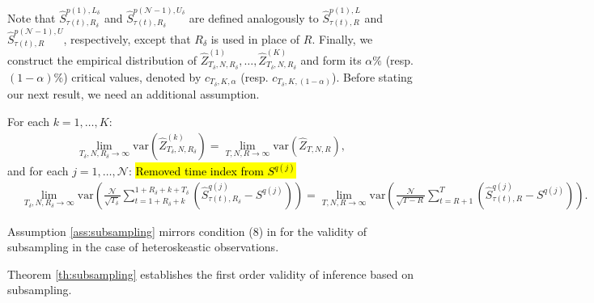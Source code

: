\noindent
Note that $\widehat{S}_{\tau(t) ,R_\delta}^{p(1), L_\delta}$ and $\widehat{S}_{\tau(t), R_\delta}^{p(\mathcal{N}-1), U_\delta}$ are defined analogously to $\widehat{S}_{\tau(t) ,R}^{p(1), L}$ and $\widehat{S}_{\tau(t), R}^{p(\mathcal{N}-1), U}$, respectively, except that $R_\delta$ is used in place of $R$. Finally, we construct the empirical distribution of $\widehat{Z}_{T_\delta,N,R_\delta}^{(1)},\ldots,\widehat{Z}_{T_\delta,N,R_\delta}^{(K)}$ and form its $\alpha \%$ (resp. $(1-\alpha )\%$) critical values, denoted by $c_{T_\delta,K,\alpha }$ (resp. $c_{T_\delta,K,(1-\alpha )}$). Before stating our next result, we need an additional assumption.
\begin{assumption}
\label{ass:subsampling} 
For each $k=1,\ldots,K$: 
\begin{align*}
    \lim_{T_\delta,N,R_\delta\rightarrow \infty }\mathrm{var}\left(\widehat{Z}_{T_\delta,N,R_\delta}^{(k)}\right)= \lim_{T,N,R\rightarrow \infty }\mathrm{var} \left(\widehat{Z}_{T,N,R}\right),
\end{align*}
and for each $j=1,\ldots,\mathcal{N}$: \hl{Removed time index from $S^{q(j)}$}
\begin{align*}
&\lim_{T_\delta,N,R_\delta\rightarrow \infty }\mathrm{var}\left( \frac{\mathcal{N}}{\sqrt{T_\delta}} \sum_{t=1+R_\delta+k}^{1+R_\delta+k+T_\delta}\left( \widehat{S}_{\tau(t) ,R_\delta}^{q(j)}-S^{q(j)}\right) \right) = \lim_{T,N,R\rightarrow \infty }\mathrm{var}\left( \frac{\mathcal{N}}{\sqrt{T-R}} \sum_{t=R+1}^{T}\left( \widehat{S}_{\tau(t),R}^{q(j)}-S^{q(j)}\right) \right). 
\end{align*}
\end{assumption}

\noindent
Assumption \ref{ass:subsampling} mirrors condition (8) in \cite{politis1997subsampling} for the validity of subsampling in the case of heteroskeastic observations. 

Theorem \ref{th:subsampling} establishes the first order validity of inference based on subsampling.

